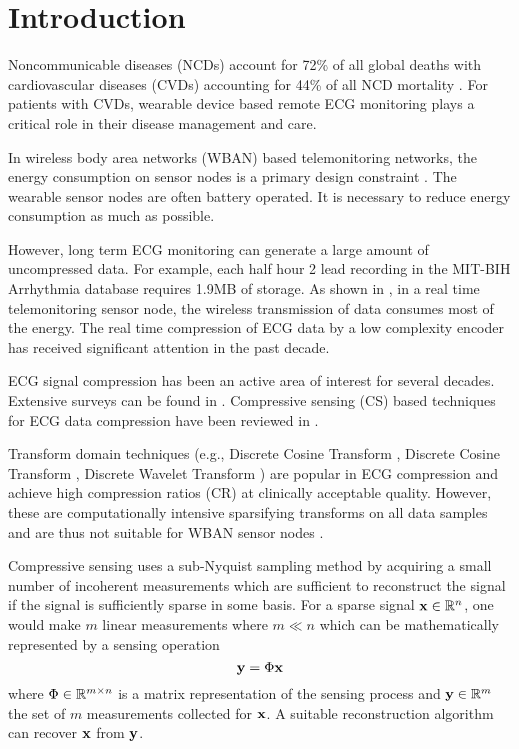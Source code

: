 \section{Introduction}
\label{sec:intro}
Noncommunicable diseases (NCDs) account for 72\%
of all global deaths with cardiovascular diseases
(CVDs) accounting for 44\% of all NCD mortality
\cite{collins2019interact}.
For patients with CVDs, wearable device based remote ECG
monitoring plays a critical role in their disease
management and care. 

In wireless body area networks (WBAN)
based telemonitoring networks\cite{cao2009enabling},
the energy consumption on sensor nodes is
a primary design constraint \cite{milenkovic2006wireless}.
The wearable sensor nodes are often battery operated.
It is necessary to reduce energy consumption as
much as possible.

However, long term ECG monitoring
can generate a large amount of uncompressed data.
For example, each half hour 2 lead recording in the
MIT-BIH Arrhythmia database \cite{moody2001impact}
requires 1.9MB of storage. As shown in \cite{mamaghanian2011compressed},
in a real time telemonitoring sensor node, the wireless
transmission of data consumes most of the energy.
The real time compression of ECG data by a low
complexity encoder has received significant attention
in the past decade.

ECG signal compression has been an active area
of interest for several decades. Extensive surveys
can be found in \cite{singh2015review,rajankar2019electrocardiogram}.
Compressive sensing (CS) based techniques for ECG
data compression have been reviewed in \cite{craven2014compressed,kumar2022review}.

Transform domain techniques
(e.g., Discrete Cosine Transform \cite{al1995dynamic},
Discrete Cosine Transform \cite{batista2001compression,bendifallah2011improved},
Discrete Wavelet Transform \cite{djohan1995ecg,lu2000wavelet,pooyan2004wavelet,kim2006wavelet}) are popular in ECG compression
and achieve high compression ratios (CR) at clinically
acceptable quality.
However, these are computationally intensive sparsifying
transforms on all data samples and are thus not suitable
for WBAN sensor nodes \cite{craven2014compressed}.

Compressive sensing \cite{donoho2006compressed,baraniuk2007compressive,
candes2006compressive, candes2008introduction, candes2006near}
uses a sub-Nyquist sampling method by acquiring a small number
of incoherent measurements which are sufficient to reconstruct
the signal if the signal is sufficiently sparse in some
basis. For a sparse signal $\mathbf{x} \in \mathbb{R}^n$, one would make
$m$ linear measurements where $m \ll n$ which can be
mathematically represented by a sensing operation
\begin{equation}
\mathbf{y} = \Phi \mathbf{x}
\end{equation}
where $\Phi \in \mathbb{R}^{m \times n}$ is a matrix
representation of the sensing process and $\mathbf{y} \in \mathbb{R}^m$
the set of $m$ measurements collected for $\mathbf{x}$.
A suitable reconstruction algorithm can recover $\mathbf{x}$
from $\mathbf{y}$.

